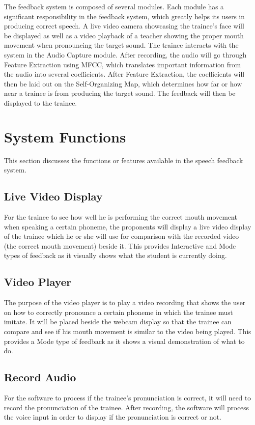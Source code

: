 The feedback system is composed of several modules. Each module has a significant responsibility in the feedback system, which greatly helps its users in producing correct speech. A live video camera showcasing the trainee's face will be displayed as well as a video playback of a teacher showing the proper mouth movement when pronouncing the target sound. The trainee interacts with the system in the Audio Capture module. After recording, the audio will go through Feature Extraction using MFCC, which translates important information from the audio into several coefficients. After Feature Extraction, the coefficients will then be laid out on the Self-Organizing Map, which determines how far or how near a trainee is from producing the target sound. The feedback will then be displayed to the trainee.

\section{System Functions}
This section discusses the functions or features available in the speech feedback system.

\subsection{Live Video Display}
For the trainee to see how well he is performing the correct mouth movement when speaking a certain phoneme, the proponents will display a live video display of the trainee which he or she will use for comparison with the recorded video (the correct mouth movement) beside it. This provides Interactive and Mode types of feedback as it visually shows what the student is currently doing.

\subsection{Video Player}
The purpose of the video player is to play a video recording that shows the user on how to correctly pronounce a certain phoneme in which the trainee must imitate. It will be placed beside the webcam display so that the trainee can compare and see if his mouth movement is similar to the video being played. This provides a Mode type of feedback as it shows a visual demonstration of what to do.

\subsection{Record Audio}
For the software to process if the trainee's pronunciation is correct, it will need to record the pronunciation of the trainee. After recording, the software will process the voice input in order to display if the pronunciation is correct or not.


